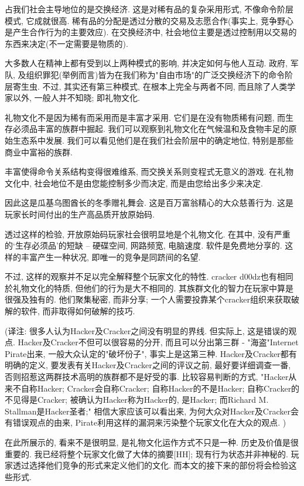 \documentclass[a4paper,12pt,UTF8,twoside]{ctexbook}
\begin{document}
占我们社会主导地位的是交换经济. 这是对稀有品的复杂采用形式, 不像命令阶层模式, 它成就很高. 稀有品的分配是透过分散的交易及志愿合作(事实上, 竞争野心是产生合作行为的主要效应). 在交换经济中, 社会地位主要是透过控制用以交易的东西来决定(不一定需要是物质的).

大多数人在精神上都有受到以上两种模式的影响, 并决定如何与他人互动. 政府, 军队, 及组织罪犯(举例而言)皆为在我们称为"自由市场"的广泛交换经济下的命令阶层寄生虫. 不过, 其实还有第三种模式, 在根本上完全与两者不同, 而且除了人类学家以外, 一般人并不知晓; 即礼物文化.

礼物文化不是因为稀有而采用而是丰富才采用. 它们是在没有物质稀有问题, 而生存必须品丰富的族群中掘起. 我们可以观察到礼物文化在气候温和及食物丰足的原始生态系中发展. 我们可以看见他们是在我们社会阶层中的确定地位, 特别是那些商业中富裕的族群.

丰富使得命令关系结构变得很难维系, 而交换关系则变程式无意义的游戏. 在礼物文化中, 社会地位不是由您能控制多少而决定, 而是由您给出多少来决定.

因此这是瓜基乌图酋长的冬季赠礼舞会. 这是百万富翁精心的大众慈善行为. 这是玩家长时间付出的生产高品质开放原始码.

透过这样的检验, 开放原始码玩家社会很明显地是个礼物文化. 在其中, 没有严重的`生存必须品'的短缺 -- 硬碟空间, 网路频宽, 电脑速度. 软件是免费地分享的. 这样的丰富产生一种状况, 即唯一的竞争是同跻间的名望.

不过, 这样的观察并不足以完全解释整个玩家文化的特性. cracker d00dz也有相同於礼物文化的特质, 但他们的行为是大不相同的. 其族群文化的智力在玩家中算是很强及独有的. 他们聚集秘密, 而非分享; 一个人需要投靠某个cracker组织来获取破解的软件, 而非取得如何破解的技巧.

(译注: 很多人认为Hacker及Cracker之间没有明显的界线. 但实际上, 这是错误的观点. Hacker及Cracker不但可以很容易的分开, 而且可以分出第三群 - "海盗"Internet Pirate出来, 一般大众认定的"破坏份子", 事实上是这第三种. Hacker及Cracker都有明确的定义, 要发表有关Hacker及Cracker之间的评议之前, 最好要详细调查一番, 否则招惹这两群技术高明的族群都不是好受的事. 比较容易判断的方式, "Hacker从来不自称Hacker; Cracker会自称Cracker; 自称Hacker的不是Hacker; 自称Cracker的不见得是Cracker; 被确认为Hacker称为Hacker的, 是Hacker; 而Richard M. Stallman是Hacker圣者;" 相信大家应该可以看出来, 为何大众对Hacker及Cracker会有错误观点的由来, Pirate利用这样的漏洞来污染整个玩家文化在大众的观点. )

在此所展示的, 看来不是很明显, 是礼物文化运作方式不只是一种. 历史及价值是很重要的. 我已经将整个玩家文化做了大体的摘要[HH]; 现有行为状态并非神秘的. 玩家透过选择他们竞争的形式来定义他们的文化. 而本文的接下来的部份将会检验这些形式.
\end{document}
